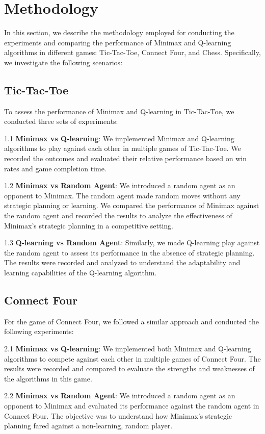 \documentclass{article}
\begin{document}
\section{Methodology}
In this section, we describe the methodology employed for conducting the experiments and comparing the performance of Minimax and Q-learning algorithms in different games: Tic-Tac-Toe, Connect Four, and Chess. Specifically, we investigate the following scenarios:

\subsection{Tic-Tac-Toe}
To assess the performance of Minimax and Q-learning in Tic-Tac-Toe, we conducted three sets of experiments:

1.1 \textbf{Minimax vs Q-learning}: We implemented Minimax and Q-learning algorithms to play against each other in multiple games of Tic-Tac-Toe. We recorded the outcomes and evaluated their relative performance based on win rates and game completion time.

1.2 \textbf{Minimax vs Random Agent}: We introduced a random agent as an opponent to Minimax. The random agent made random moves without any strategic planning or learning. We compared the performance of Minimax against the random agent and recorded the results to analyze the effectiveness of Minimax's strategic planning in a competitive setting.

1.3 \textbf{Q-learning vs Random Agent}: Similarly, we made Q-learning play against the random agent to assess its performance in the absence of strategic planning. The results were recorded and analyzed to understand the adaptability and learning capabilities of the Q-learning algorithm.


\subsection{Connect Four}
For the game of Connect Four, we followed a similar approach and conducted the following experiments:

2.1 \textbf{Minimax vs Q-learning}: We implemented both Minimax and Q-learning algorithms to compete against each other in multiple games of Connect Four. The results were recorded and compared to evaluate the strengths and weaknesses of the algorithms in this game.

2.2 \textbf{Minimax vs Random Agent}: We introduced a random agent as an opponent to Minimax and evaluated its performance against the random agent in Connect Four. The objective was to understand how Minimax's strategic planning fared against a non-learning, random player.
\end{document}
